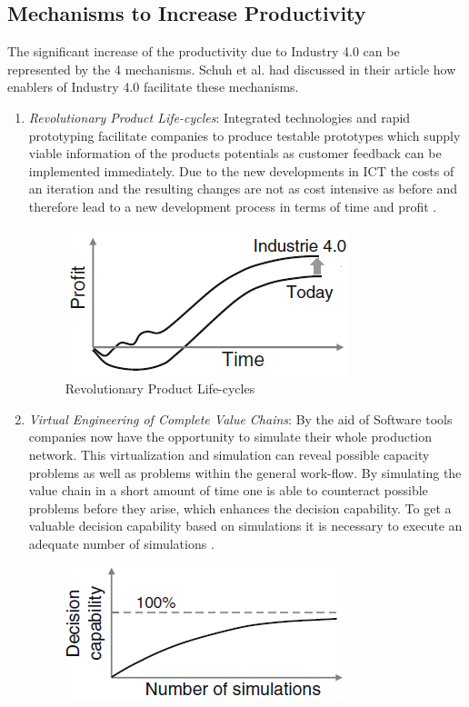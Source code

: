 \subsection{Mechanisms to Increase Productivity}
The significant increase of the productivity due to Industry 4.0 can be represented by the 4 mechanisms. Schuh et al. \cite{IN4HYPO} had discussed in their article how enablers of Industry 4.0 facilitate these mechanisms.
\begin{enumerate}
	\item \textit{Revolutionary Product Life-cycles}: Integrated technologies
	and rapid prototyping facilitate companies to produce testable prototypes which
	supply viable information of the products potentials as customer feedback can be
	implemented immediately. Due to the new developments in ICT the costs of an iteration and the resulting changes are not as cost intensive as before and therefore lead to a new development process in terms of time and profit  \cite{IN4HYPO}.
	\begin{figure}[h!]
		\includegraphics[scale=0.5]{./gfx/revlifecycle}
		\centering
		\caption{Revolutionary Product Life-cycles \cite{IN4HYPO}}
		\label{fig:2.2}
	\end{figure}
	\item \textit{Virtual Engineering of Complete Value Chains}: By the aid of Software tools companies now have the opportunity to simulate their whole production network. This virtualization and simulation can reveal possible capacity problems as well as problems within the general work-flow. By simulating the value
	chain in a short amount of time one is able to counteract possible problems before
	they arise, which enhances the decision capability. To get a valuable decision capability based on simulations	it is necessary to execute an adequate number of simulations  \cite{IN4HYPO}.
	\begin{figure}[h!]
		\includegraphics[scale=0.5]{./gfx/revsimul}

\end{figure}
\end{enumerate}
